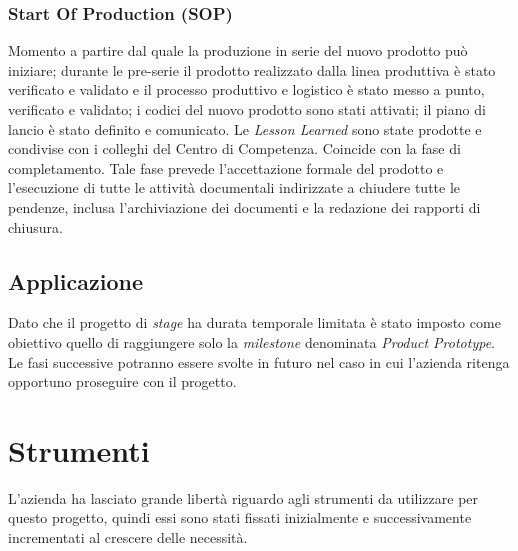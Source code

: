 \subsubsection{Start Of Production (SOP)}
Momento a partire dal quale la produzione in serie
del nuovo prodotto può iniziare; durante le pre-serie il prodotto realizzato dalla
linea produttiva è stato verificato e validato e il processo produttivo e logistico è
stato messo a punto, verificato e validato; i codici del nuovo prodotto sono stati
attivati; il piano di lancio è stato definito e comunicato. Le \emph{Lesson Learned} sono
state prodotte e condivise con i colleghi del Centro di Competenza. Coincide con la fase di completamento. Tale fase prevede l'accettazione formale del prodotto
e l'esecuzione di tutte le attività documentali indirizzate a chiudere tutte
le pendenze, inclusa l'archiviazione dei documenti e la redazione dei rapporti di
chiusura.\\


\subsection{Applicazione}
Dato che il progetto di \emph{stage} ha durata temporale limitata è stato imposto come obiettivo quello di raggiungere solo la \emph{milestone} denominata \emph{Product Prototype}. Le fasi successive potranno essere svolte in futuro nel caso in cui l'azienda ritenga opportuno proseguire con il progetto.


\section{Strumenti}
L'azienda ha lasciato grande libertà riguardo agli strumenti da utilizzare per questo progetto, quindi essi sono stati fissati inizialmente e successivamente incrementati al crescere delle necessità.

